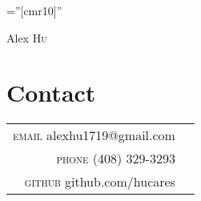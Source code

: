 \documentclass[a4paper,10pt]{article}
\begin{document}

\pagestyle{empty} %

\font\fb=''[cmr10]'' %

\par{\centering
{\Huge Alex \textsc{Hu}
}\bigskip\par}

\section{Contact}

\begin{tabular}{rl}
    \textsc{email} alexhu1719@gmail.com \\
    \textsc{phone} (408) 329-3293 \\
    \textsc{github} github.com/hucares\\
\end{tabular}

\end{document}
